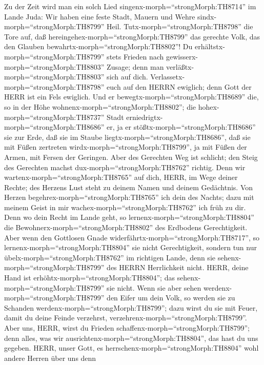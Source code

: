  Zu der Zeit wird man ein solch Lied
singenx-morph=``strongMorph:TH8714'' im Lande Juda: Wir haben eine feste
Stadt, Mauern und Wehre sindx-morph=``strongMorph:TH8799'' Heil.
 Tutx-morph=``strongMorph:TH8798'' die Tore auf, daß
hereingehex-morph=``strongMorph:TH8799'' das gerechte Volk, das den
Glauben bewahrtx-morph=``strongMorph:TH8802''!  Du
erhältstx-morph=``strongMorph:TH8799'' stets Frieden nach
gewisserx-morph=``strongMorph:TH8803'' Zusage; denn man
verläßtx-morph=``strongMorph:TH8803'' sich auf dich. 
Verlassetx-morph=``strongMorph:TH8798'' euch auf den HERRN ewiglich;
denn Gott der HERR ist ein Fels ewiglich.  Und er
bewegtx-morph=``strongMorph:TH8689'' die, so in der Höhe
wohnenx-morph=``strongMorph:TH8802''; die
hohex-morph=``strongMorph:TH8737'' Stadt
erniedrigtx-morph=``strongMorph:TH8686'' er, ja er
stößtx-morph=``strongMorph:TH8686'' sie zur Erde, daß sie im Staube
liegtx-morph=``strongMorph:TH8686'',  daß sie mit Füßen
zertreten wirdx-morph=``strongMorph:TH8799'', ja mit Füßen der Armen,
mit Fersen der Geringen.  Aber des Gerechten Weg ist
schlicht; den Steig des Gerechten machst
dux-morph=``strongMorph:TH8762'' richtig.  Denn wir
wartenx-morph=``strongMorph:TH8765'' auf dich, HERR, im Wege deiner
Rechte; des Herzens Lust steht zu deinem Namen und deinem Gedächtnis.
 Von Herzen begehrex-morph=``strongMorph:TH8765'' ich dein
des Nachts; dazu mit meinem Geist in mir
wachex-morph=``strongMorph:TH8762'' ich früh zu dir. Denn wo dein Recht
im Lande geht, so lernenx-morph=``strongMorph:TH8804'' die
Bewohnerx-morph=``strongMorph:TH8802'' des Erdbodens Gerechtigkeit.
 Aber wenn den Gottlosen Gnade
widerfährtx-morph=``strongMorph:TH8717'', so
lernenx-morph=``strongMorph:TH8804'' sie nicht Gerechtigkeit, sondern
tun nur übelx-morph=``strongMorph:TH8762'' im richtigen Lande, denn sie
sehenx-morph=``strongMorph:TH8799'' des HERRN Herrlichkeit nicht.
 HERR, deine Hand ist erhöhtx-morph=``strongMorph:TH8804'';
das sehenx-morph=``strongMorph:TH8799'' sie nicht. Wenn sie aber sehen
werdenx-morph=``strongMorph:TH8799'' den Eifer um dein Volk, so werden
sie zu Schanden werdenx-morph=``strongMorph:TH8799''; dazu wirst du sie
mit Feuer, damit du deine Feinde verzehrst,
verzehrenx-morph=``strongMorph:TH8799''.  Aber uns, HERR,
wirst du Frieden schaffenx-morph=``strongMorph:TH8799''; denn alles, was
wir ausrichtenx-morph=``strongMorph:TH8804'', das hast du uns gegeben.
 HERR, unser Gott, es
herrschenx-morph=``strongMorph:TH8804'' wohl andere Herren über uns denn
